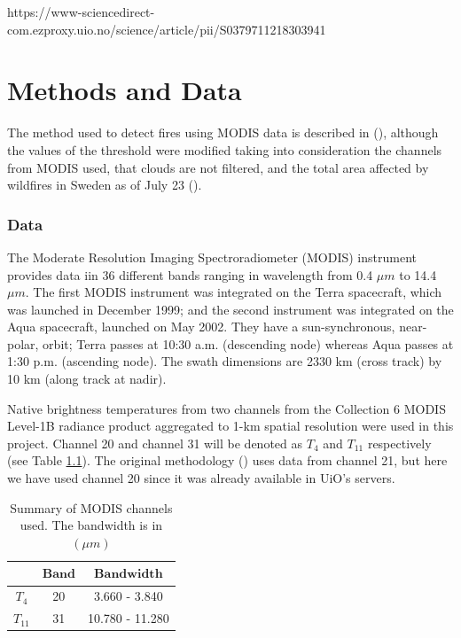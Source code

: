 \documentclass[a4paper, article, oneside, UKenglish]{memoir}
\newcommand{\0}{\mathbf{0}}
\newcommand{\1}{\mathbf{1}}
\begin{document}
https://www-sciencedirect-com.ezproxy.uio.no/science/article/pii/S0379711218303941


\chapter{Methods and Data}

The method used to detect fires using MODIS data is described in \citeauthor{giglio_et_al_2016} (\citeyear{giglio_et_al_2016}), although the values of the threshold were modified taking into consideration the channels from MODIS used, that clouds are not filtered, and the total area affected by wildfires in Sweden as of July 23 (\cite{2018_sweden_wildfires}).

\subsection{Data}
The Moderate Resolution Imaging Spectroradiometer (MODIS) instrument provides data iin 36 different bands ranging in wavelength from 0.4 $\mu m$ to 14.4 $\mu m$. The first MODIS instrument was integrated on the Terra spacecraft, which was launched in December 1999; and the second instrument was integrated on the Aqua spacecraft, launched on May 2002. They have a  sun-synchronous, near-polar, orbit; Terra passes at 10:30 a.m. (descending node) whereas Aqua passes at 1:30 p.m. (ascending node).  The swath dimensions are 2330 km (cross track) by 10 km (along track at nadir).

Native brightness temperatures from two channels from the Collection 6 MODIS Level-1B radiance product aggregated to 1-km spatial resolution were used in this project. Channel 20 and channel 31 will be denoted as $T_4$ and $T_{11}$ respectively (see Table \ref{tab:modis_bands}). The original methodology (\cite{giglio_et_al_2016}) uses data from channel 21, but here we have used channel 20 since it was already available in UiO's servers.

\begin{table}[htbp]
    \centering
    \begin{tabular}{@{}ccc@{}}
        \toprule
        \(\boldsymbol{}\) & \(\boldsymbol{Band}\) & \(\boldsymbol{Bandwidth}\)
        \\
        \midrule
        $T_4$     & 20   & 3.660 - 3.840 
        \\
        $T_{11}$    & 31   & 10.780 - 11.280
        \\
        \bottomrule
    \end{tabular}
    \caption{Summary of MODIS channels used. The bandwidth is in $(\mu m)$}
    \label{tab:modis_bands}
\end{table}
\end{document}
